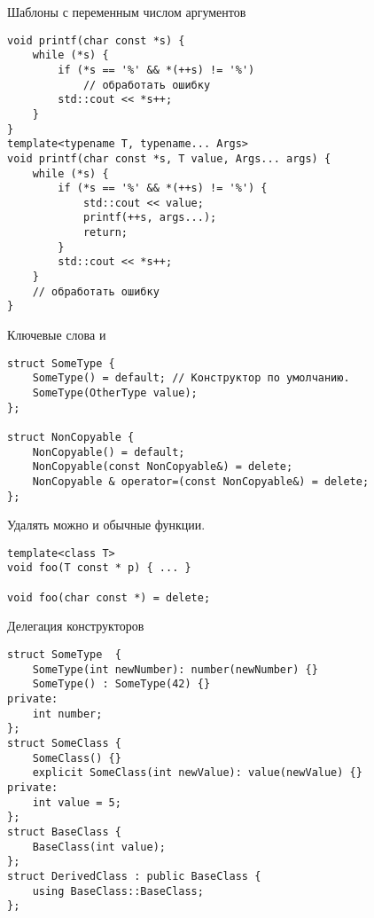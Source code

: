 \documentclass[aspectration=1610,t]{beamer}
\begin{document}
\begin{frame}[fragile]{Шаблоны с переменным числом аргументов}
    \begin{lstlisting}
void printf(char const *s) {
    while (*s) {
        if (*s == '%' && *(++s) != '%')
            // обработать ошибку
        std::cout << *s++;
    }
}
template<typename T, typename... Args>
void printf(char const *s, T value, Args... args) {
    while (*s) {
        if (*s == '%' && *(++s) != '%') {
            std::cout << value;
            printf(++s, args...);
            return;
        }
        std::cout << *s++;
    }
    // обработать ошибку
}
\end{lstlisting}
\end{frame}

%


\begin{frame}[fragile]{Ключевые слова  и }
\begin{lstlisting}
struct SomeType {
    SomeType() = default; // Конструктор по умолчанию.
    SomeType(OtherType value);
};

struct NonCopyable {
    NonCopyable() = default;
    NonCopyable(const NonCopyable&) = delete;
    NonCopyable & operator=(const NonCopyable&) = delete;
};
\end{lstlisting}
\pause\medskip
Удалять можно и обычные функции.
\begin{lstlisting}
template<class T>
void foo(T const * p) { ... }

void foo(char const *) = delete;
\end{lstlisting}
\end{frame}

\begin{frame}[fragile]{Делегация конструкторов}
    \begin{lstlisting}
struct SomeType  {
    SomeType(int newNumber): number(newNumber) {}
    SomeType() : SomeType(42) {}
private:
    int number;
};
struct SomeClass {
    SomeClass() {}
    explicit SomeClass(int newValue): value(newValue) {}
private:
    int value = 5;
};
struct BaseClass {
    BaseClass(int value);
};
struct DerivedClass : public BaseClass {
    using BaseClass::BaseClass;
};
\end{lstlisting}
\end{frame}
\end{document}
